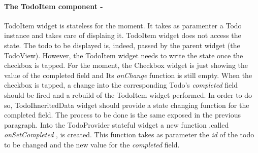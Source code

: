 \paragraph{The TodoItem component - }
\label{subpar:todo_app_inherited_widget_todoitem_component}
TodoItem widget is stateless for the moment. It takes as paramenter a Todo instance and takes care of displaing it. TodoItem widget does not access the state. The todo to be displayed is, indeed, passed by the parent widget (the TodoView). However, the TodoItem widget needs to write the state once the checkbox is tapped. For the moment, the Checkbox widget is just showing the value of the completed field and Its \textit{onChange   }function is still empty. When the checkbox is tapped, a change into the corresponding Todo’s \textit{completed }field should be fired and a rebuild of the TodoItem widget performed. In order to do so, TodoIhneritedData widget should provide a state changing function for the completed field. The process to be done is the same exposed in the previous paragraph. Into the TodoProvider stateful widget a new function ,called \textit{onSetCompleted  }, is created. This function takes as parameter the \textit{id} of the todo to be changed and the new value for the \textit{completed }field.
\mbox{}\\

